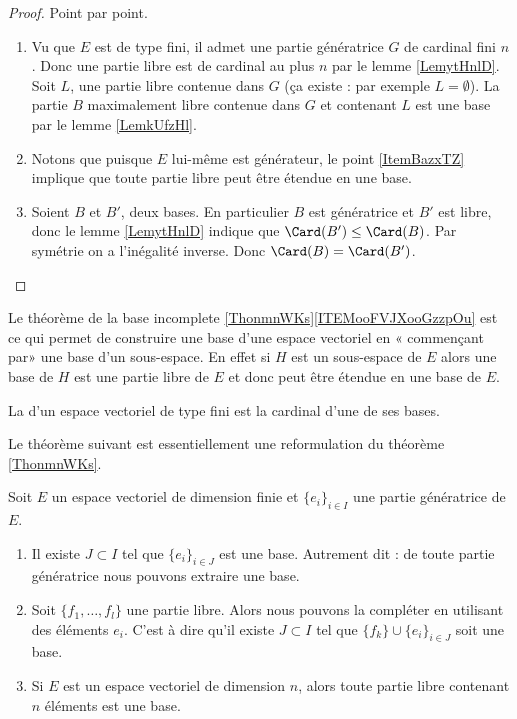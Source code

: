 \begin{proof}
    Point par point.
    \begin{enumerate}
        \item
    Vu que \( E\) est de type fini, il admet une partie génératrice \( G\) de cardinal fini \( n\). Donc une partie libre est de cardinal au plus \( n\) par le lemme \ref{LemytHnlD}. Soit \( L\), une partie libre contenue dans \( G\) (ça existe : par exemple \( L=\emptyset\)). La partie \( B\) maximalement libre contenue dans \( G\) et contenant \( L\) est une base par le lemme \ref{LemkUfzHl}.
\item
Notons que puisque \( E\) lui-même est générateur, le point \ref{ItemBazxTZ} implique que toute partie libre peut être étendue en une base.
\item
    Soient \( B\) et \( B'\), deux bases. En particulier \( B\) est génératrice et \( B'\) est libre, donc le lemme \ref{LemytHnlD} indique que \( \Card(B')\leq \Card(B)\). Par symétrie on a l'inégalité inverse. Donc \( \Card(B)=\Card(B')\).
    \end{enumerate}
\end{proof}

\begin{remark}      \label{REMooYGJEooEcZQKa}
    Le théorème de la base incomplete \ref{ThonmnWKs}\ref{ITEMooFVJXooGzzpOu} est ce qui permet de construire une base d'une espace vectoriel en « commençant par» une base d'un sous-espace. En effet si \( H\) est un sous-espace de \( E\) alors une base de \( H\) est une partie libre de \( E\) et donc peut être étendue en une base de \( E\).
\end{remark}

\begin{definition}
    La  d'un espace vectoriel de type fini est la cardinal d'une de ses bases.
\end{definition}

Le théorème suivant est essentiellement une reformulation du théorème \ref{ThonmnWKs}.
\begin{theorem} \label{ThoBaseIncompjblieG}     \label{ThoMGQZooIgrXjy}
    Soit \( E\) un espace vectoriel de dimension finie et \( \{ e_i \}_{i\in I}\) une partie génératrice de \( E\).

    \begin{enumerate}
        \item
            Il existe \( J\subset I\) tel que \( \{ e_i \}_{i\in J}\) est une base. Autrement dit : de toute partie génératrice nous pouvons extraire une base.
        \item
            Soit \( \{ f_1,\ldots, f_l \}\) une partie libre. Alors nous pouvons la compléter en utilisant des éléments \( e_i\). C'est à dire qu'il existe \( J\subset I\) tel que \( \{ f_k \}\cup\{ e_i \}_{i\in J}\) soit une base.
        \item       \label{ItemHIVAooPnTlsBi}
            Si \( E\) est un espace vectoriel de dimension \( n\), alors toute partie libre contenant \( n\) éléments est une base.
    \end{enumerate}
\end{theorem}

